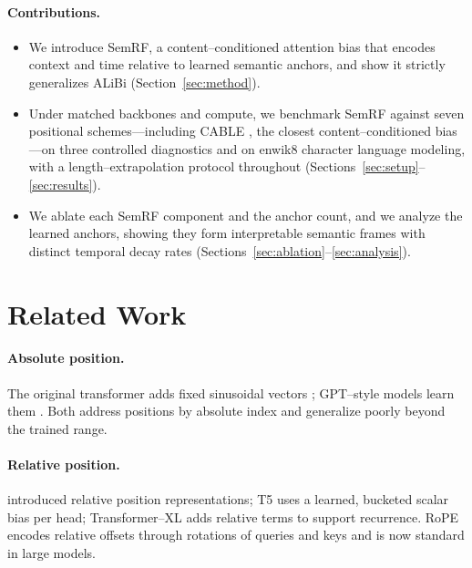 \documentclass[11pt]{article}
\begin{document}
\paragraph{Contributions.}
\begin{itemize}
  \item We introduce SemRF, a content--conditioned attention bias that encodes
  context and time relative to learned semantic anchors, and show it strictly
  generalizes ALiBi (Section~\ref{sec:method}).
  \item Under matched backbones and compute, we benchmark SemRF against seven
  positional schemes---including CABLE \citep{veisi2025cable}, the closest
  content--conditioned bias---on three controlled diagnostics and on enwik8
  character language modeling, with a length--extrapolation protocol throughout
  (Sections~\ref{sec:setup}--\ref{sec:results}).
  \item We ablate each SemRF component and the anchor count, and we analyze the
  learned anchors, showing they form interpretable semantic frames with distinct
  temporal decay rates (Sections~\ref{sec:ablation}--\ref{sec:analysis}).
\end{itemize}

\section{Related Work}
\label{sec:related}

\paragraph{Absolute position.} The original transformer adds fixed sinusoidal
vectors \citep{vaswani2017attention}; GPT--style models learn them
\citep{radford2019language}. Both address positions by absolute index and
generalize poorly beyond the trained range.

\paragraph{Relative position.} \citet{shaw2018self} introduced relative position
representations; T5 \citep{raffel2020exploring} uses a learned, bucketed scalar
bias per head; Transformer--XL \citep{dai2019transformerxl} adds relative terms
to support recurrence. RoPE \citep{su2021roformer} encodes relative offsets
through rotations of queries and keys and is now standard in large models.
\end{document}
